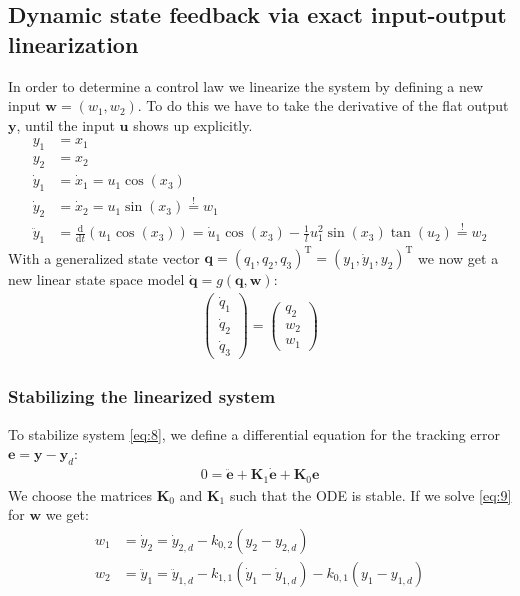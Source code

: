 \documentclass[a4paper,11pt,headings=standardclasses]{scrartcl}%
\renewcommand{\d}{\mathrm{d}} %
\newcommand{\uu}{\mathbf{u}}
\newcommand{\y}{\mathbf{y}}
\begin{document}
\subsection{Dynamic state feedback via exact input-output linearization}
In order to determine a control law we linearize the system by defining a new input $\mathbf{w}=(w_1,w_2)$. To do this we have to take the derivative of the flat output $\y$, until the input $\uu$ shows up explicitly. 
\begin{subequations}
\begin{align}
y_1 &= x_1 \\
y_2 &= x_2 \\
\dot{y}_1 &= \dot{x}_1 = u_1 \cos(x_3)\\
\dot{y}_2 &= \dot{x}_2 = u_1 \sin(x_3) \overset{!}{=} w_1 \label{eq:7d}\\
\ddot{y}_1 &= \frac{\d}{\d t}(u_1 \cos(x_3)) = \dot{u}_1 \cos(x_3) - \frac{1}{l}u_1^2\sin(x_3)\tan(u_2) \overset{!}{=} w_2 \label{eq:7e}
\end{align}
\end{subequations}
With a generalized state vector $\mathbf{q} = (q_1,q_2,q_3)^\textrm{T}=(y_1,\dot{y}_1,y_2)^\textrm{T}$ we now get a new linear state space model $\dot{\mathbf{q}}=g(\mathbf{q},\mathbf{w})$:
\begin{align}
\label{eq:8}
\begin{pmatrix}
\dot{q}_1 \\\dot{q}_2 \\ \dot{q}_3
\end{pmatrix}
=
\begin{pmatrix}
q_2 \\ w_2 \\ w_1
\end{pmatrix}
\end{align}
\subsubsection{Stabilizing the linearized system}
To stabilize system \eqref{eq:8}, we define a differential equation for the tracking error $\mathbf{e}=\y-\y_d$:
\begin{align}
\label{eq:9}
0 = \ddot{\mathbf{e}} + \mathbf{K}_1 \dot{\mathbf{e}}+\mathbf{K}_0 \mathbf{e}
\end{align}
We choose the matrices $\mathbf{K}_0$ and $\mathbf{K}_1$ such that the ODE is stable.
If we solve \eqref{eq:9} for $\mathbf{w}$ we get:
\begin{subequations}
\label{eq:10}
\begin{align}
w_1 &=  \dot{y}_2 =\dot{y}_{2,d} - k_{0,2}(y_2-y_{2,d}) \\
w_2 &= \ddot{y}_1 = \ddot{y}_{1,d} - k_{1,1}(\dot{y}_1-\dot{y}_{1,d})-k_{0,1}(y_1-y_{1,d})
\end{align}
\end{subequations}
\end{document}
